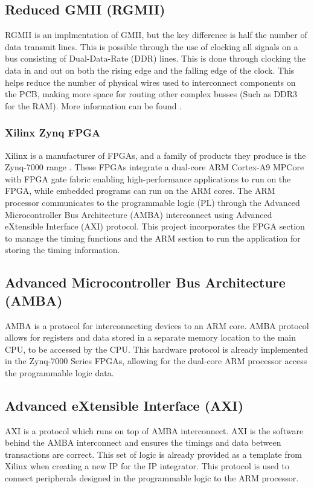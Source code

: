 \subsection{Reduced GMII (RGMII)}

\par RGMII is an implmentation of GMII, but the key difference is half the number of data transmit lines. This is
possible through the use of clocking all signals on a bus consisting of Dual-Data-Rate (DDR) lines. This is done 
through clocking the data in and out on both the rising edge and the falling edge of the clock. This helps reduce 
the number of physical wires used to interconnect components on the PCB, making more space for routing other complex 
busses (Such as DDR3 for the RAM). More information can be found \cite{RGMIISpec}.

\subsubsection{Xilinx Zynq FPGA}

\par Xilinx is a manufacturer of FPGAs, and a family of products they produce is the Zynq-7000 range \cite{fpga}.
These FPGAs integrate a dual-core ARM Cortex-A9 MPCore with FPGA gate fabric enabling high-performance 
applications to run on the FPGA, while embedded programs can run on the ARM cores. The ARM processor communicates
to the programmable logic (PL) through the Advanced Microcontroller Bus Architecture (AMBA) interconnect
using Advanced eXtensible Interface (AXI) protocol.
This project incorporates the FPGA section to manage the timing functions and the ARM section to run the 
application for storing the timing information.

\subsection{Advanced Microcontroller Bus Architecture (AMBA)}

AMBA is a protocol for interconnecting devices to an ARM core. AMBA protocol allows for registers
and data stored in a separate memory location to the main CPU, to be accessed by the CPU. This
hardware protocol is already implemented in the Zynq-7000 Series FPGAs, allowing for the dual-core
ARM processor access the programmable logic data.

\subsection{Advanced eXtensible Interface (AXI)}

AXI is a protocol which runs on top of AMBA interconnect. AXI is the software behind the AMBA interconnect and
ensures the timings and data between transactions are correct. This set of logic is already provided
as a template from Xilinx when creating a new IP for the IP integrator. This protocol is used to
connect peripherals designed in the programmable logic to the ARM processor.
